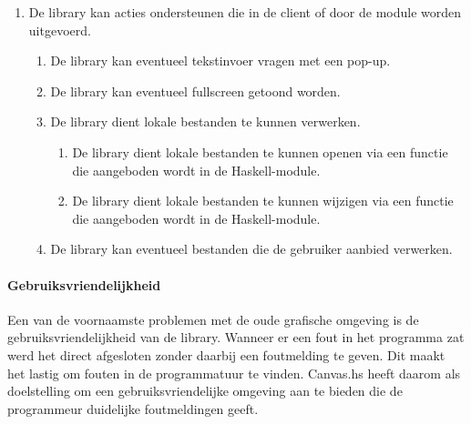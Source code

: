 \begin{enumerate}[label={R\arabic*}]
\setcounter{enumi}{\value{startvalue}}
	\item De library kan acties ondersteunen die in de client of door de module worden uitgevoerd.
	\begin{enumerate}[label={R\arabic{enumi}.\arabic*}]
		\item \label{req:action:prompt} De library kan eventueel tekstinvoer vragen met een pop-up.
		\item \label{req:action:fullscreen} De library kan eventueel fullscreen getoond worden.
		\item \label{req:action:localfiles} De library dient lokale bestanden te kunnen verwerken.
		\begin{enumerate}[label={R\arabic{enumi}.\arabic{enumii}.\arabic*}]
			\item De library dient lokale bestanden te kunnen openen via een functie die aangeboden wordt in de Haskell-module.
			\item De library dient lokale bestanden te kunnen wijzigen via een functie die aangeboden wordt in de Haskell-module.
		\end{enumerate}
		
		\item \label{req:action:userfiles} De library kan eventueel bestanden die de gebruiker aanbied verwerken.
	\end{enumerate}
	\setcounter{startvalue}{\value{enumi}}
\end{enumerate}

\paragraph{Gebruiksvriendelijkheid} Een van de voornaamste problemen met de oude grafische omgeving is de gebruiksvriendelijkheid van de library. Wanneer er een fout in het programma zat werd het direct afgesloten zonder daarbij een foutmelding te geven. Dit maakt het lastig om fouten in de programmatuur te vinden. Canvas.hs heeft daarom als doelstelling om een gebruiksvriendelijke omgeving aan te bieden die de programmeur duidelijke foutmeldingen geeft.

